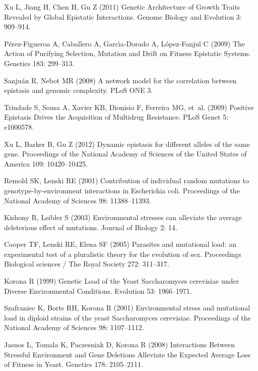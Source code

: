 \documentclass[10pt]{article}
\begin{document}
\begin{thebibliography}{10}
Xu L, Jiang H, Chen H, Gu Z (2011) {Genetic Architecture of Growth Traits
  Revealed by Global Epistatic Interactions}.
\newblock Genome Biology and Evolution 3: 909--914.

P\'{e}rez-Figueroa A, Caballero A, Garc\'{\i}a-Dorado A, L\'{o}pez-Fanjul C
  (2009) {The Action of Purifying Selection, Mutation and Drift on Fitness
  Epistatic Systems}.
\newblock Genetics 183: 299--313.

Sanju\'{a}n R, Nebot MR (2008) {A network model for the correlation between
  epistasis and genomic complexity}.
\newblock PLoS ONE 3.

Trindade S, Sousa A, Xavier KB, Dionisio F, Ferreira MG, et~al. (2009)
  {Positive Epistasis Drives the Acquisition of Multidrug Resistance}.
\newblock PLoS Genet 5: e1000578.

Xu L, Barker B, Gu Z (2012) {Dynamic epistasis for different alleles of the
  same gene.}
\newblock Proceedings of the National Academy of Sciences of the United States
  of America 109: 10420--10425.

Remold SK, Lenski RE (2001) {Contribution of individual random mutations to
  genotype-by-environment interactions in Escherichia coli}.
\newblock Proceedings of the National Academy of Sciences 98: 11388--11393.

Kishony R, Leibler S (2003) {Environmental stresses can alleviate the average
  deleterious effect of mutations}.
\newblock Journal of Biology 2: 14.

Cooper TF, Lenski RE, Elena SF (2005) {Parasites and mutational load: an
  experimental test of a pluralistic theory for the evolution of sex.}
\newblock Proceedings Biological sciences / The Royal Society 272: 311--317.

Korona R (1999) {Genetic Load of the Yeast Saccharomyces cerevisiae under
  Diverse Environmental Conditions}.
\newblock Evolution 53: 1966--1971.

Szafraniec K, Borts RH, Korona R (2001) {Environmental stress and mutational
  load in diploid strains of the yeast Saccharomyces cerevisiae}.
\newblock Proceedings of the National Academy of Sciences 98: 1107--1112.

Jasnos L, Tomala K, Paczesniak D, Korona R (2008) {Interactions Between
  Stressful Environment and Gene Deletions Alleviate the Expected Average Loss
  of Fitness in Yeast}.
\newblock Genetics 178: 2105--2111.


\end{thebibliography}
\end{document}
